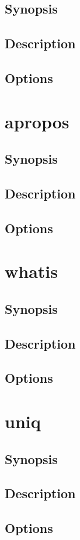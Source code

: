\documentclass[a4paper, 10pt, onecolumn, openright, oneside]{book}
\begin{document}
			\subsection{Synopsis}
			\subsection{Description}
			\subsection{Options}
		\section{apropos}
			\subsection{Synopsis}
			\subsection{Description}
			\subsection{Options}
		\section{whatis}
			\subsection{Synopsis}
			\subsection{Description}
			\subsection{Options}
		\section{uniq}
			\subsection{Synopsis}
			\subsection{Description}
			\subsection{Options}
\end{document}
